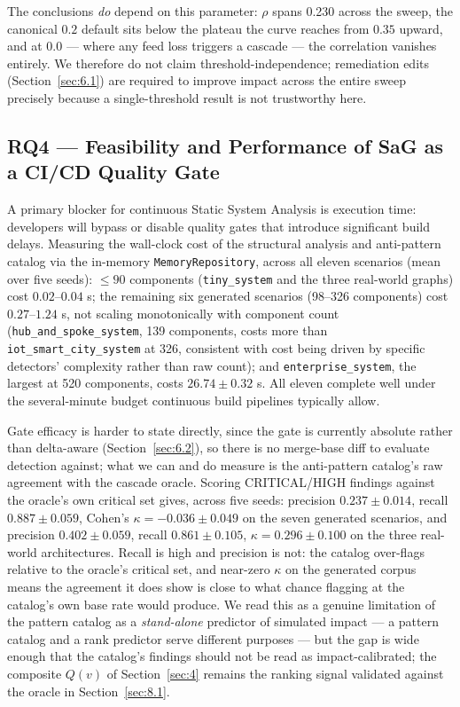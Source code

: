 The conclusions \emph{do} depend on this parameter: \(\rho\) spans 0.230 across the sweep, the
canonical \(0.2\) default sits below the plateau the curve reaches from \(0.35\) upward, and at
\(0.0\) --- where any feed loss triggers a cascade --- the correlation vanishes entirely. We
therefore do not claim threshold-independence; remediation edits (Section~\ref{sec:6.1}) are required
to improve impact across the entire sweep precisely because a single-threshold result is not
trustworthy here.

\hypertarget{rq4-feasibility-and-performance-of-sag-as-a-cicd-quality-gate}{%
\subsection{RQ4 --- Feasibility and Performance of SaG as a CI/CD Quality Gate}\label{rq4-feasibility-and-performance-of-sag-as-a-cicd-quality-gate}}

\label{sec:8.4}

A primary blocker for continuous Static System Analysis is execution time: developers will bypass or
disable quality gates that introduce significant build delays. Measuring the wall-clock cost of the
structural analysis and anti-pattern catalog via the in-memory \texttt{MemoryRepository}, across all
eleven scenarios (mean over five seeds): \(\le 90\) components (\texttt{tiny\_system} and the three
real-world graphs) cost \(0.02\)--\(0.04\) s; the remaining six generated scenarios (98--326
components) cost \(0.27\)--\(1.24\) s, not scaling monotonically with component count
(\texttt{hub\_and\_spoke\_system}, 139 components, costs more than \texttt{iot\_smart\_city\_system}
at 326, consistent with cost being driven by specific detectors' complexity rather than raw count);
and \texttt{enterprise\_system}, the largest at 520 components, costs \(26.74 \pm 0.32\) s. All
eleven complete well under the several-minute budget continuous build pipelines typically allow.

Gate efficacy is harder to state directly, since the gate is currently absolute rather than
delta-aware (Section~\ref{sec:6.2}), so there is no merge-base diff to evaluate detection against;
what we can and do measure is the anti-pattern catalog's raw agreement with the cascade oracle.
Scoring CRITICAL/HIGH findings against the oracle's own critical set gives, across five seeds:
precision \(0.237 \pm 0.014\), recall \(0.887 \pm 0.059\), Cohen's \(\kappa = -0.036 \pm 0.049\) on
the seven generated scenarios, and precision \(0.402 \pm 0.059\), recall \(0.861 \pm 0.105\),
\(\kappa = 0.296 \pm 0.100\) on the three real-world architectures. Recall is high and precision is
not: the catalog over-flags relative to the oracle's critical set, and near-zero \(\kappa\) on the
generated corpus means the agreement it does show is close to what chance flagging at the catalog's
own base rate would produce. We read this as a genuine limitation of the pattern catalog as a
\emph{stand-alone} predictor of simulated impact --- a pattern catalog and a rank predictor serve
different purposes --- but the gap is wide enough that the catalog's findings should not be read as
impact-calibrated; the composite \(Q(v)\) of Section~\ref{sec:4} remains the ranking signal validated
against the oracle in Section~\ref{sec:8.1}.

